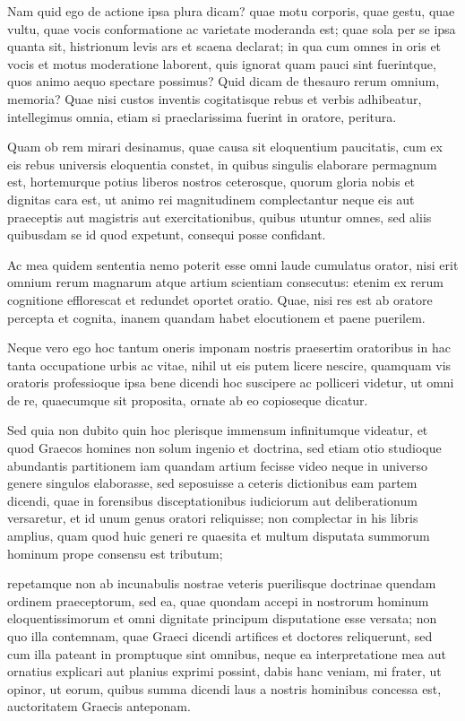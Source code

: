  Nam quid ego de actione ipsa plura dicam? quae motu corporis, quae gestu, quae vultu, quae vocis conformatione ac varietate moderanda est; quae sola per se ipsa quanta sit, histrionum levis ars et scaena declarat; in qua cum omnes in oris et vocis et motus moderatione laborent, quis ignorat quam pauci sint fuerintque, quos animo aequo spectare possimus? Quid dicam de thesauro rerum omnium, memoria? Quae nisi custos inventis cogitatisque rebus et verbis adhibeatur, intellegimus omnia, etiam si praeclarissima fuerint in oratore, peritura.

 Quam ob rem mirari desinamus, quae causa sit eloquentium paucitatis, cum ex eis rebus universis eloquentia constet, in quibus singulis elaborare permagnum est, hortemurque potius liberos nostros ceterosque, quorum gloria nobis et dignitas cara est, ut animo rei magnitudinem complectantur neque eis aut praeceptis aut magistris aut exercitationibus, quibus utuntur omnes, sed aliis quibusdam se id quod expetunt, consequi posse confidant.

 Ac mea quidem sententia nemo poterit esse omni laude cumulatus orator, nisi erit omnium rerum magnarum atque artium scientiam consecutus: etenim ex rerum cognitione efflorescat et redundet oportet oratio. Quae, nisi res est ab oratore percepta et cognita, inanem quandam habet elocutionem et paene puerilem.

 Neque vero ego hoc tantum oneris imponam nostris praesertim oratoribus in hac tanta occupatione urbis ac vitae, nihil ut eis putem licere nescire, quamquam vis oratoris professioque ipsa bene dicendi hoc suscipere ac polliceri videtur, ut omni de re, quaecumque sit proposita, ornate ab eo copioseque dicatur.

 Sed quia non dubito quin hoc plerisque immensum infinitumque videatur, et quod Graecos homines non solum ingenio et doctrina, sed etiam otio studioque abundantis partitionem iam quandam artium fecisse video neque in universo genere singulos elaborasse, sed seposuisse a ceteris dictionibus eam partem dicendi, quae in forensibus disceptationibus iudiciorum aut deliberationum versaretur, et id unum genus oratori reliquisse; non complectar in his libris amplius, quam quod huic generi re quaesita et multum disputata summorum hominum prope consensu est tributum;

 repetamque non ab incunabulis nostrae veteris puerilisque doctrinae quendam ordinem praeceptorum, sed ea, quae quondam accepi in nostrorum hominum eloquentissimorum et omni dignitate principum disputatione esse versata; non quo illa contemnam, quae Graeci dicendi artifices et doctores reliquerunt, sed cum illa pateant in promptuque sint omnibus, neque ea interpretatione mea aut ornatius explicari aut planius exprimi possint, dabis hanc veniam, mi frater, ut opinor, ut eorum, quibus summa dicendi laus a nostris hominibus concessa est, auctoritatem Graecis anteponam.

